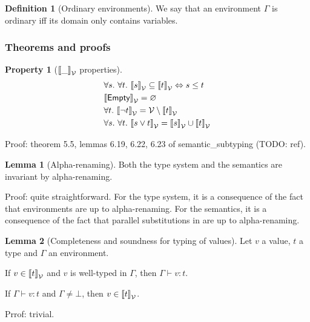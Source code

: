 \documentclass[a4paper]{article}
\theoremstyle{definition}
\newtheorem{lemma}{Lemma}
\newtheorem{definition}{Definition}
\newtheorem{property}{Property}
\begin{document}
      \begin{definition}[Ordinary environments]
        We say that an environment $\Gamma$ is ordinary iff its domain only contains variables.
      \end{definition}

    \subsubsection{Theorems and proofs}

        \begin{property}[${\llbracket \_ \rrbracket}_{\mathcal{V}}$ properties]
          \begin{align*}
            &\forall s.\ \forall t.\ {\llbracket s \rrbracket}_{\mathcal{V}} \subseteq {\llbracket t \rrbracket}_{\mathcal{V}} \Leftrightarrow s \leq t\\
            &{\llbracket \textsf{Empty} \rrbracket}_{\mathcal{V}} = \varnothing\\
            &\forall t.\ {\llbracket \neg t \rrbracket}_{\mathcal{V}} = \mathcal{V} \setminus {\llbracket t \rrbracket}_{\mathcal{V}}\\
            &\forall s.\ \forall t.\ {\llbracket s\vee t \rrbracket}_{\mathcal{V}} = {\llbracket s \rrbracket}_{\mathcal{V}} \cup {\llbracket t \rrbracket}_{\mathcal{V}}
          \end{align*}
        \end{property}
        Proof: theorem 5.5, lemmas 6.19, 6.22, 6.23 of semantic\_subtyping (TODO: ref).

        \begin{lemma}[Alpha-renaming]
          Both the type system and the semantics are invariant by alpha-renaming.
        \end{lemma}
        Proof: quite straightforward.
        For the type system, it is a consequence of the fact that environments are up to alpha-renaming.
        For the semantics, it is a consequence of the fact that parallel substitutions in 
        are up to alpha-renaming.

        \begin{lemma}[Completeness and soundness for typing of values]
          Let $v$ a value, $t$ a type and $\Gamma$ an environment.

          If $v \in {\llbracket t \rrbracket}_{\mathcal{V}}$ and $v$ is well-typed in $\Gamma$, then $\Gamma\vdash v:t$.

          If $\Gamma \vdash v:t$ and $\Gamma\neq\bot$, then $v \in {\llbracket t \rrbracket}_{\mathcal{V}}$.
        \end{lemma}
        Prrof: trivial.
    
\end{document}
